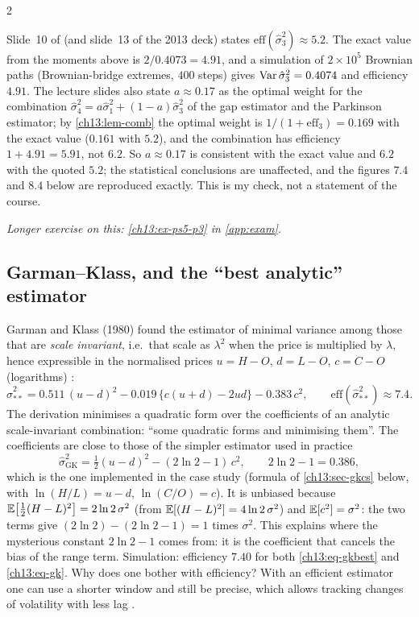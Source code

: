 \begin{paracol}{2}
\begin{coursenote}\label{ch13:cn-park}
Slide~10 of  (and slide~13 of the 2013 deck) states $\mathrm{eff}(\hat\sigma_3^2)\approx5.2$. The exact value from
the moments above is $2/0.4073=4.91$, and a simulation of $2\times10^5$ Brownian paths (Brownian-bridge extremes, $400$ steps) gives $\operatorname{Var}\hat\sigma_3^2=0.4074$ and
efficiency $4.91$. The lecture slides also state $a\approx0.17$ as the optimal weight for the combination
$\hat\sigma_4^2=a\hat\sigma_1^2+(1-a)\hat\sigma_3^2$ of the gap estimator and the Parkinson estimator; by \cref{ch13:lem-comb} the optimal weight is $1/(1+\mathrm{eff}_3)=0.169$ with the exact value ($0.161$ with $5.2$), and the combination has
efficiency $1+4.91=5.91$, not $6.2$. So $a\approx0.17$ is consistent with the exact value and $6.2$ with the quoted $5.2$; the
statistical conclusions are unaffected, and the figures $7.4$ and $8.4$ below are reproduced exactly. This is my check, not a statement of the course.
\end{coursenote}

\noindent\emph{Longer exercise on this: \cref{ch13:ex-ps5-p3} in \cref{app:exam}.}

\subsection{Garman--Klass, and the ``best analytic'' estimator}\label{ch13:sec-gk}
Garman and Klass (1980) found the estimator of minimal variance among those that are \emph{scale invariant}, i.e.\ that
scale as $\lambda^2$ when the price is multiplied by $\lambda$, hence expressible in the normalised prices
$u=H-O$, $d=L-O$, $c=C-O$ (logarithms) :
\begin{equation}\label{ch13:eq-gkbest}
  \hat\sigma_{**}^2=0.511\,(u-d)^2-0.019\,\bigl\{c(u+d)-2ud\bigr\}-0.383\,c^2,\qquad \mathrm{eff}(\hat\sigma^2_{**})\approx7.4 .
\end{equation}
The derivation minimises a quadratic form over the coefficients of an analytic scale-invariant combination: ``some quadratic
forms and minimising them''. The coefficients are close to those of the simpler estimator used in practice
\begin{equation}\label{ch13:eq-gk}
  \hat\sigma^2_{\mathrm{GK}}=\tfrac12(u-d)^2-(2\ln2-1)\,c^2,\qquad 2\ln2-1=0.386,
\end{equation}
which is the one implemented in the case study (formula of \cref{ch13:sec-gkcs} below, with $\ln(H/L)=u-d$, $\ln(C/O)=c$).
It is unbiased because $\mathbb{E}\bigl[\tfrac12(H-L)^2\bigr]=2\ln2\,\sigma^2$ (from $\mathbb{E}[(H-L)^2]=4\ln2\,\sigma^2$) and $\mathbb{E}[c^2]=\sigma^2$: the two terms give
$(2\ln2)-(2\ln2-1)=1$ times $\sigma^2$. This explains where the mysterious constant $2\ln2-1$ comes from: it is the coefficient that cancels the
bias of the range term. Simulation: efficiency $7.40$ for both \eqref{ch13:eq-gkbest} and \eqref{ch13:eq-gk}.
Why does one bother with efficiency? With an efficient estimator one can use a shorter window and still be precise, which allows
tracking changes of volatility with less lag .


\end{paracol}
